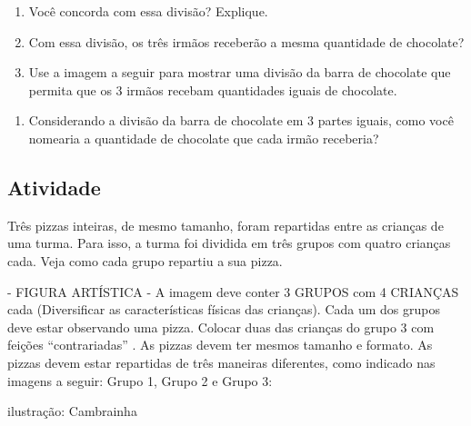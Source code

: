 \documentclass[a4,12pt]{book}
\begin{document}
\begin{enumerate} [\quad a)] %
  \item     Você concorda com essa divisão? Explique.
  \item     Com essa divisão, os três irmãos receberão a mesma quantidade de chocolate?
  \item     Use a imagem a seguir para mostrar uma divisão da barra de chocolate que permita que os 3 irmãos recebam quantidades iguais de chocolate. 
\end{enumerate} %
\begin{enumerate} [\quad a)] %
  \item     Considerando a divisão da barra de chocolate em 3 partes iguais, como você nomearia a quantidade de chocolate que cada irmão receberia? 
\end{enumerate} %









\subsection{Atividade}







Três pizzas inteiras, de mesmo tamanho, foram repartidas entre as crianças de uma turma. Para isso, a turma foi dividida em três grupos com quatro crianças cada. Veja como cada grupo repartiu a sua pizza.

\begin{imagem*}[breakable]{}{}    - FIGURA ARTÍSTICA - A imagem deve conter 3 GRUPOS com 4 CRIANÇAS cada (Diversificar as características físicas das crianças). Cada um dos grupos deve estar observando uma pizza. Colocar duas das crianças do grupo 3 com feições   ``contrariadas''  . As pizzas devem ter mesmos tamanho e formato. As pizzas devem estar repartidas de três maneiras diferentes, como indicado nas imagens a seguir: Grupo 1, Grupo 2 e Grupo 3:   
  
  
  ilustração: Cambrainha  
  
\end{imagem*}
\end{document}
